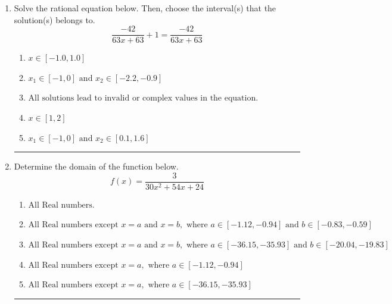\documentclass[14pt]{extbook}
\newcommand{\litem}[1]{\item#1\hspace*{-1cm}\rule{\textwidth}{0.4pt}}
\begin{document}
\begin{enumerate}
{\begin{enumerate}[label=\Alph*.]
\end{enumerate} }
\litem{
Solve the rational equation below. Then, choose the interval(s) that the solution(s) belongs to.\[ \frac{-42}{63x + 63} + 1 = \frac{-42}{63x + 63} \]\begin{enumerate}[label=\Alph*.]
\item \( x \in [-1.0,1.0] \)
\item \( x_1 \in [-1, 0] \text{ and } x_2 \in [-2.2,-0.9] \)
\item \( \text{All solutions lead to invalid or complex values in the equation.} \)
\item \( x \in [1,2] \)
\item \( x_1 \in [-1, 0] \text{ and } x_2 \in [0.1,1.6] \)

\end{enumerate} }
\litem{
Determine the domain of the function below.\[ f(x) = \frac{3}{30x^{2} +54 x + 24} \]\begin{enumerate}[label=\Alph*.]
\item \( \text{All Real numbers.} \)
\item \( \text{All Real numbers except } x = a \text{ and } x = b, \text{ where } a \in [-1.12, -0.94] \text{ and } b \in [-0.83, -0.59] \)
\item \( \text{All Real numbers except } x = a \text{ and } x = b, \text{ where } a \in [-36.15, -35.93] \text{ and } b \in [-20.04, -19.83] \)
\item \( \text{All Real numbers except } x = a, \text{ where } a \in [-1.12, -0.94] \)
\item \( \text{All Real numbers except } x = a, \text{ where } a \in [-36.15, -35.93] \)


\end{enumerate}}
\end{enumerate}
\end{document}
